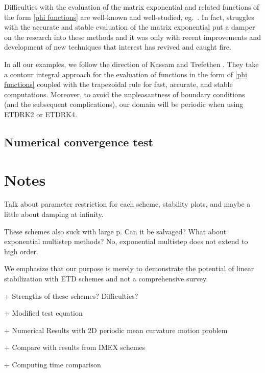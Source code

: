 Difficulties with the evaluation of the matrix exponential and related functions of the form \cref{phi functions} are well-known and well-studied, eg.\ \cite{moler2003nineteen,higham2002accuracy,higham2008functions,hochbruck1997krylov}. In fact, struggles with the accurate and stable evaluation of the matrix exponential put a damper on the research into these methods and it was only with recent improvements and development of new techniques \cite{hochbruck1997krylov,sidje1998expokit,kassam2005fourth,simoncini2007recent,higham2008functions} that interest has revived and caught fire.

In all our examples, we follow the direction of Kassam and Trefethen \cite{kassam2005fourth}. They take a contour integral approach for the evaluation of functions in the form of \cref{phi functions} coupled with the trapezoidal rule for fast, accurate, and stable computations. Moreover, to avoid the unpleasantness of boundary conditions (and the subsequent complications), our domain will be periodic when using ETDRK2 or ETDRK4.

\subsection{Numerical convergence test}


\clearpage
\section{Notes}



Talk about parameter restriction for each scheme, stability plots, and maybe a little about damping at infinity.

These schemes also suck with large p. Can it be salvaged? What about exponential multistep methods? No, exponential multistep does not extend to high order.

We emphasize that our purpose is merely to demonstrate the potential of linear stabilization with ETD schemes and not a comprehensive survey.

+ Strengths of these schemes? Difficulties? 

+ Modified test equation

+ Numerical Results with 2D periodic mean curvature motion problem  

+ Compare with results from IMEX schemes

+ Computing time comparison
